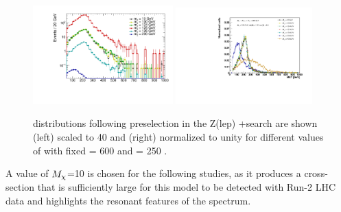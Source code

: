 \begin{figure}
\centering
\includegraphics[width=0.48\textwidth]{texinputs/04_grid/figures/monoz/leptonic/mDMScan_mA600_ma250_MET.pdf}
\includegraphics[width=0.47\textwidth]{texinputs/04_grid/figures/monoz/leptonic/mDMscan_ma250.pdf}
\caption{\MET distributions following preselection in the Z(lep) +\MET search are shown (left) scaled to 40 \ifb and (right) normalized to unity for different values of \mDM with fixed \mA = 600 \GeV and \ma = 250 \GeV.}
\label{fig:dm_scan_ll}
\end{figure}

A value of $M_{\chi}$=10 is chosen for the following studies, as it produces a cross-section that is sufficiently large for this model to be detected with Run-2 LHC data and highlights the resonant features of the \MET spectrum.
